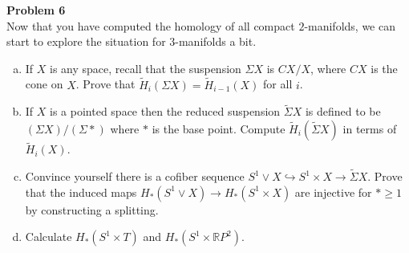 \documentclass[a4paper, 12pt]{article}
\newenvironment{problem}[2][Problem]
    { \begin{mdframed}[backgroundcolor=gray!20] \textbf{#1 #2} \\}
    {  \end{mdframed}}
\begin{document}
\begin{problem}{6}
Now that you have computed the homology of all compact \(2\)-manifolds, we can start to explore the situation for \(3\)-manifolds a bit. 
\begin{enumerate}[(a)]
\item If \(X\) is any space, recall that the suspension \(\Sigma X\) is \(CX/X\), where \(CX\) is the cone on \(X\). Prove that \(\tilde{H}_i(\Sigma X)=\tilde{H}_{i-1}(X)\) for all \(i\). 
\item If \(X\) is a pointed space then the reduced suspension \(\tilde{\Sigma}X\) is defined to be \((\Sigma X)/(\Sigma *)\) where \(*\) is the base point. Compute \(\tilde{H}_i(\tilde{\Sigma}X)\) in terms of \(\tilde{H}_i(X)\). 
\item Convince yourself there is a cofiber sequence \(S^1\vee X\hookrightarrow S^1\times X\rightarrow \tilde{\Sigma}X\). Prove that the induced maps \(H_*(S^1\vee X)\rightarrow H_*(S^1\times X)\) are injective for \(*\geq 1\) by constructing a splitting.
\item Calculate \(H_*(S^1\times T)\) and \(H_*(S^1\times \mathbb{R}P^2)\).
\end{enumerate}
\end{problem}
\end{document}
